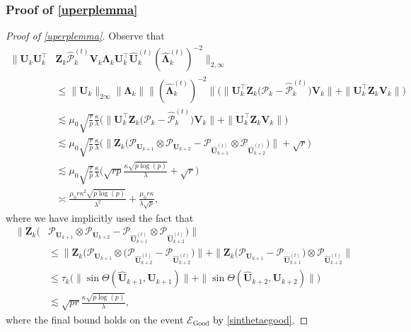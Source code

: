 \documentclass[10pt]{article}
\newcommand{\0}{{\mathbf{0}}}
\newcommand{\1}{{\mathbf{1}}}
\newcommand{\U}{{\mathbf{U}}}
\renewcommand{\t}{^{\top}}
\newcommand{\uhat}{\mathbf{\hat{U}}}
\renewcommand{\hat}{\widehat}
\renewcommand{\hat}{\widehat}
\begin{document}
\subsubsection{Proof of \cref{uperplemma}}
\begin{proof}[Proof of \cref{uperplemma}]
Observe that
\begin{align*}
    \| \U_k \U_k\t &\mathbf{Z}_k\mathcal{\hat P}_k^{(t)} \mathbf{V}_k \mathbf{\Lambda}_k \U_k\t \uhat_k^{(t)} ( \mathbf{\hat \Lambda}_k^{(t)})^{-2} \|_{2,\infty} \\
    &\leq \| \U_k \|_{2\infty} \| \mathbf{\Lambda}_k \| \|(\mathbf{\hat \Lambda}_k^{(t)})^{-2} \| \bigg( \| \U_k\t \mathbf{Z}_k \big( \mathcal{P}_k -\mathcal{\hat P}_k^{(t)} \big) \mathbf{V}_k \| + \| \U_k\t \mathbf{Z}_k \mathbf{V}_k \|  \bigg)\\
    &\lesssim \mu_0 \sqrt{\frac{r}{p}} \frac{\kappa}{\lambda} \bigg( \| \U_k\t \mathbf{Z}_k \big( \mathcal{P}_k -\mathcal{\hat P}_k^{(t)} \big) \mathbf{V}_k \| + \| \U_k\t \mathbf{Z}_k \mathbf{V}_k \|  \bigg) \\
    &\lesssim \mu_0 \sqrt{\frac{r}{p}} \frac{\kappa}{\lambda} \bigg( \| \mathbf{Z}_k \big( \mathcal{P}_{\U_{k+1}} \otimes \mathcal{P}_{\U_{k+2}}  -\mathcal{P}_{\uhat_{k+1}^{(t)}} \otimes \mathcal{P}_{\uhat_{k+2}^{(t)}}  \big)  \| + \sqrt{r} \bigg) \\
    &\lesssim \mu_0 \sqrt{\frac{r}{p}} \frac{\kappa}{\lambda} \bigg( \sqrt{rp} \frac{\kappa \sqrt{p\log(p)}}{\lambda} + \sqrt{r} \bigg)  \\
    &\asymp \frac{\mu_0 r \kappa^2 \sqrt{p\log(p)}}{\lambda^2} + \frac{\mu_0 r \kappa}{\lambda \sqrt{p}},
\end{align*}
where we have implicitly used the fact that
\begin{align*}
    \| \mathbf{Z}_k \big(& \mathcal{P}_{\U_{k+1}} \otimes \mathcal{P}_{\U_{k+2}}  -\mathcal{P}_{\uhat_{k+1}^{(t)}} \otimes \mathcal{P}_{\uhat_{k+2}^{(t)}}  \big)  \|\\
    &\leq  \| \mathbf{Z}_k \big( \mathcal{P}_{\U_{k+1}} \otimes \bigg( \mathcal{P}_{\uhat^{(t)}_{k+2}}  - \mathcal{P}_{\uhat_{k+2}^{(t)}}  \bigg)   \| + \| \mathbf{Z}_k \bigg( \mathcal{P}_{\U_{k+1}} - \mathcal{P}_{\uhat^{(t)}_{k+1}} \bigg) \otimes  \mathcal{P}_{\uhat^{(t)}_{k+2}} \| \\
    &\leq \tau_k \bigg( \|\sin\Theta(\uhat_{k+1}, \U_{k+1}) \| + \| \sin\Theta(\uhat_{k+2}, \U_{k+2}) \| \bigg)\\
    &\lesssim \sqrt{pr} \frac{\kappa \sqrt{p\log(p)}}{\lambda},
\end{align*}
where the final bound holds on the event $\mathcal{E}_{\mathrm{Good}}$ \textcolor{black}{by \eqref{sinthetaegood}}.  
\end{proof}
\end{document}
